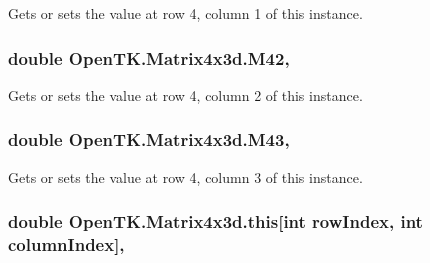 Gets or sets the value at row 4, column 1 of this instance. 

\hypertarget{struct_open_t_k_1_1_matrix4x3d_ac5a37fab15654e6f5ac6c7f088eebec1}{
\subsubsection[{M42}]{\setlength{\rightskip}{0pt plus 5cm}double Open\-T\-K.\-Matrix4x3d.\-M42\hspace{0.3cm}{\ttfamily [get]}, {\ttfamily [set]}}}\label{struct_open_t_k_1_1_matrix4x3d_ac5a37fab15654e6f5ac6c7f088eebec1}


Gets or sets the value at row 4, column 2 of this instance. 

\hypertarget{struct_open_t_k_1_1_matrix4x3d_a5c33c559ab02ab1463c601539507b242}{
\subsubsection[{M43}]{\setlength{\rightskip}{0pt plus 5cm}double Open\-T\-K.\-Matrix4x3d.\-M43\hspace{0.3cm}{\ttfamily [get]}, {\ttfamily [set]}}}\label{struct_open_t_k_1_1_matrix4x3d_a5c33c559ab02ab1463c601539507b242}


Gets or sets the value at row 4, column 3 of this instance. 

\hypertarget{struct_open_t_k_1_1_matrix4x3d_af1423e7a0ca44314ac693ffc506ec278}{
\subsubsection[{this[int row\-Index, int column\-Index]}]{\setlength{\rightskip}{0pt plus 5cm}double Open\-T\-K.\-Matrix4x3d.\-this\mbox{[}int row\-Index, int column\-Index\mbox{]}\hspace{0.3cm}{\ttfamily [get]}, {\ttfamily [set]}}}\label{struct_open_t_k_1_1_matrix4x3d_af1423e7a0ca44314ac693ffc506ec278}


